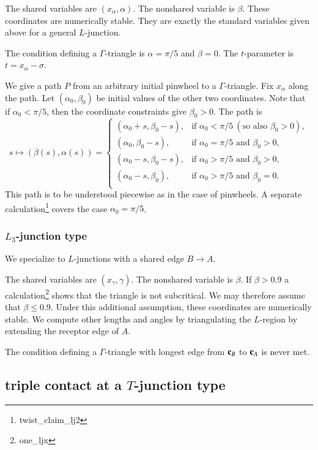 The shared variables are $(x_\alpha,\alpha)$.  The nonshared variable is $\beta$.
These coordinates are numerically stable.  They are exactly the standard variables given above for a
general $L$-junction.

The condition defining a $\Gamma$-triangle is $\alpha=\pi/5$ and $\beta=0$.   The $t$-parameter is $t =x_\alpha - \sigma$.

We give a path $P$ from an arbitrary initial pinwheel 
to a $\Gamma$-triangle.  Fix $x_\alpha$ along the path.  Let $(\alpha_0,\beta_0)$ be initial values of the other two coordinates.
Note that if $\alpha_0<\pi/5$, then the coordinate constraints give $\beta_0>0$.
The path is 
\[
s\mapsto (\beta(s),\alpha(s)) = 
\begin{cases}
(\alpha_0+s,\beta_0-s),&\text{if } \alpha_0 < \pi/5 ~(\text{so also } \beta_0>0),\\
(\alpha_0,\beta_0-s),&\text{if } \alpha_0 = \pi/5 \text{ and } \beta_0 > 0,\\
(\alpha_0-s,\beta_0-s),&\text{if } \alpha_0 > \pi/5 \text{ and } \beta_0 > 0,\\
(\alpha_0-s,\beta_0),&\text{if } \alpha_0 > \pi/5 \text{ and } \beta_0 = 0.\\
\end{cases}
\]
This path is to be understood piecewise as in the case of pinwheels. 
A separate calculation\footnote{twist\_claim\_lj2} covers the case $\alpha_0=\pi/5$.


\subsubsection{$L_3$-junction type}

We specialize to $L$-junctions with a shared edge $B\to A$.  

The shared variables are $(x_\gamma,\gamma)$.  The nonshared variable is $\beta$.
If $\beta > 0.9$ a calculation\footnote{one\_ljx} shows that the triangle is not subcritical.  We may therefore assume
that $\beta\le 0.9$.  Under this additional assumption,
these coordinates are numerically stable.    We compute other lengths and angles by triangulating the $L$-region by
extending the receptor edge of $A$.


The condition defining a $\Gamma$-triangle with longest edge from ${\mathbf c}_B$ to ${\mathbf c}_A$ is never met.



\subsection{triple contact at a $T$-junction type}

